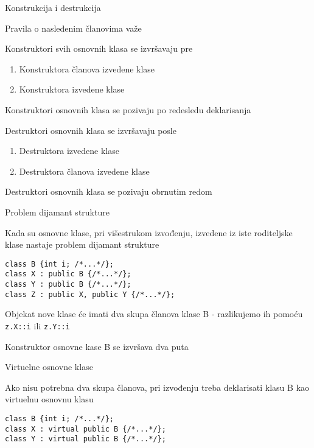 \documentclass{article}
\newenvironment{xitemize}{%
    
    \itemize
    \larger
}{%
    \enditemize
}
\let\olditemize\itemize
\let\endolditemize\enditemize
\renewenvironment{itemize}{%
    \smaller
    \olditemize
}{%
    \endolditemize
}
\providecommand{\inlinecode}[1]{\texttt{#1}}
\begin{document}
\begin{xitemize}
\begin{itemize}
\end{itemize}
\item Konstrukcija i destrukcija
\begin{itemize}
    \item Pravila o nasleđenim članovima važe
    \item Konstruktori svih osnovnih klasa se izvršavaju pre
    \begin{enumerate}
        \item Konstruktora članova izvedene klase
        \item Konstruktora izvedene klase
    \end{enumerate}
    \item Konstruktori osnovnih klasa se pozivaju po redesledu deklarisanja
    \item Destruktori osnovnih klasa se izvršavaju posle
    \begin{enumerate}
        \item Destruktora izvedene klase
        \item Destruktora članova izvedene klase
    \end{enumerate}
    \item Destruktori osnovnih klasa se pozivaju obrnutim redom
\end{itemize}
\item Problem dijamant strukture
\begin{itemize}
    \item Kada su osnovne klase, pri višestrukom izvođenju, izvedene iz iste roditeljske klase nastaje problem dijamant strukture
    \begin{lstlisting}
class B {int i; /*...*/};
class X : public B {/*...*/};
class Y : public B {/*...*/};
class Z : public X, public Y {/*...*/};  
    \end{lstlisting}
\item Objekat nove klase će imati dva skupa članova klase B - razlikujemo ih pomoću \inlinecode{z.X::i} ili \inlinecode{z.Y::i}
\item Konstruktor osnovne kase B se izvršava dva puta
\end{itemize}
\item Virtuelne osnovne klase
\begin{itemize}
    \item Ako nisu potrebna dva skupa članova, pri izvođenju treba deklarisati klasu B kao virtuelnu osnovnu klasu
\begin{lstlisting}
class B {int i; /*...*/};
class X : virtual public B {/*...*/};
class Y : virtual public B {/*...*/};

\end{lstlisting}
\end{itemize}
\end{xitemize}
\end{document}
